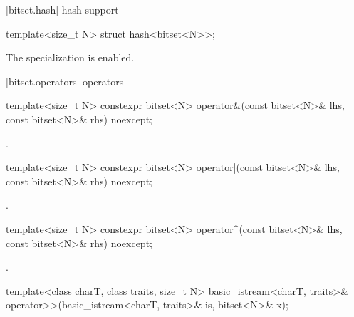 [bitset.hash]{ hash support}

%
\begin{itemdecl}
template<size_t N> struct hash<bitset<N>>;
\end{itemdecl}

\begin{itemdescr}
\pnum
The specialization is enabled.
\end{itemdescr}


[bitset.operators]{ operators}

%
\begin{itemdecl}
template<size_t N>
  constexpr bitset<N> operator&(const bitset<N>& lhs, const bitset<N>& rhs) noexcept;
\end{itemdecl}

\begin{itemdescr}
\pnum
\returns
{}.
\end{itemdescr}

%
\begin{itemdecl}
template<size_t N>
  constexpr bitset<N> operator|(const bitset<N>& lhs, const bitset<N>& rhs) noexcept;
\end{itemdecl}

\begin{itemdescr}
\pnum
\returns
{}.
\end{itemdescr}

%
\begin{itemdecl}
template<size_t N>
  constexpr bitset<N> operator^(const bitset<N>& lhs, const bitset<N>& rhs) noexcept;
\end{itemdecl}

\begin{itemdescr}
\pnum
\returns
{}.
\end{itemdescr}

%
\begin{itemdecl}
template<class charT, class traits, size_t N>
  basic_istream<charT, traits>&
    operator>>(basic_istream<charT, traits>& is, bitset<N>& x);
\end{itemdecl}

